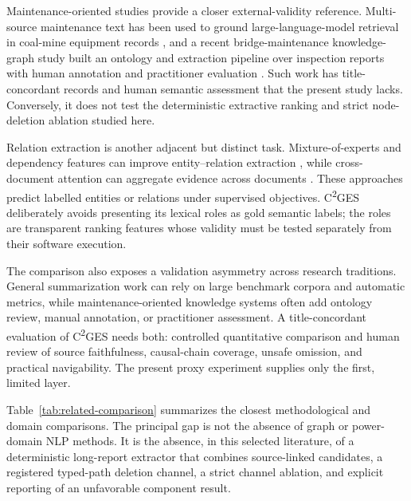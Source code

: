 \documentclass[applsci,article,submit,moreauthors]{Definitions/mdpi}
\newcommand{\cges}{C\textsuperscript{2}GES}
\begin{document}
Maintenance-oriented studies provide a closer external-validity reference. Multi-source maintenance text has been used to ground large-language-model retrieval in coal-mine equipment records \cite{cao2024coalmaintenance}, and a recent bridge-maintenance knowledge-graph study built an ontology and extraction pipeline over inspection reports with human annotation and practitioner evaluation \cite{zgg2026bridge}. Such work has title-concordant records and human semantic assessment that the present study lacks. Conversely, it does not test the deterministic extractive ranking and strict node-deletion ablation studied here.

Relation extraction is another adjacent but distinct task. Mixture-of-experts and dependency features can improve entity--relation extraction \cite{li2025moere}, while cross-document attention can aggregate evidence across documents \cite{she2025clear}. These approaches predict labelled entities or relations under supervised objectives. \cges{} deliberately avoids presenting its lexical roles as gold semantic labels; the roles are transparent ranking features whose validity must be tested separately from their software execution.

The comparison also exposes a validation asymmetry across research traditions. General summarization work can rely on large benchmark corpora and automatic metrics, while maintenance-oriented knowledge systems often add ontology review, manual annotation, or practitioner assessment. A title-concordant evaluation of \cges{} needs both: controlled quantitative comparison and human review of source faithfulness, causal-chain coverage, unsafe omission, and practical navigability. The present proxy experiment supplies only the first, limited layer.

Table~\ref{tab:related-comparison} summarizes the closest methodological and domain comparisons. The principal gap is not the absence of graph or power-domain NLP methods. It is the absence, in this selected literature, of a deterministic long-report extractor that combines source-linked candidates, a registered typed-path deletion channel, a strict channel ablation, and explicit reporting of an unfavorable component result.
\end{document}
